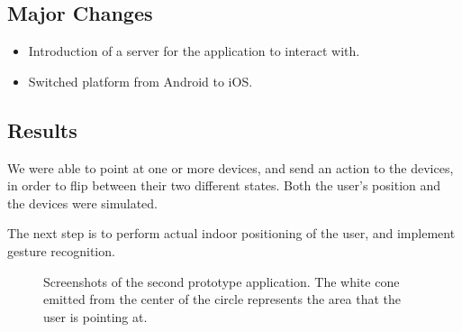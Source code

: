 \subsection{Major Changes}
\begin{itemize}
    \item Introduction of a server for the application to interact with.
    \item Switched platform from Android to iOS.
\end{itemize}

\subsection{Results}

We were able to point at one or more devices,
and send an action to the devices, 
in order to flip between their two different states. 
Both the user's position and the devices were simulated.

The next step is to perform actual indoor positioning of the user,
and implement gesture recognition.

\begin{figure}[!htb]%
    \centering
    \caption{Screenshots of the second prototype application. The white cone emitted from the center of the circle represents the area that the user is pointing at.}
    \label{fig:prototype2-app-screenshots}
\end{figure}

